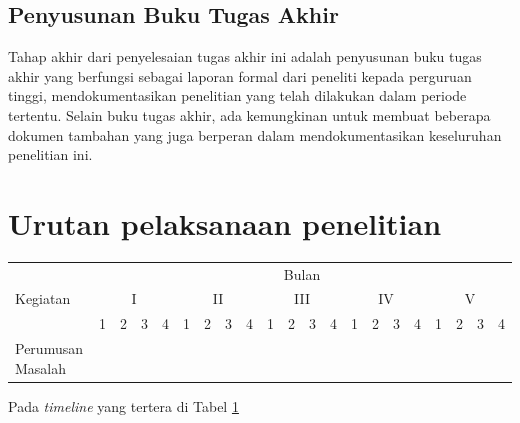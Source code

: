 \subsection{Penyusunan Buku Tugas Akhir}
Tahap akhir dari penyelesaian tugas akhir ini adalah penyusunan buku tugas akhir yang berfungsi sebagai laporan formal dari peneliti kepada perguruan tinggi, mendokumentasikan penelitian yang telah dilakukan dalam periode tertentu. Selain buku tugas akhir, ada kemungkinan untuk membuat beberapa dokumen tambahan yang juga berperan dalam mendokumentasikan keseluruhan penelitian ini.



\section{Urutan pelaksanaan penelitian}
\newcommand{\w}{}
\newcommand{\G}{\cellcolor{gray}}
\begin{table}[H]
  \label{tbl:timeline}
  \begin{tabular}{|p{2.5cm}|c|c|c|c|c|c|c|c|c|c|c|c|c|c|c|c|c|c|c|c|}

    \hline
    \multirow{3}{*}{Kegiatan} & \multicolumn{20}{|c|}{Bulan}                                                                 \\
    \cline{2-21}  & \multicolumn{4}{|c|}{I} & \multicolumn{4}{|c|}{II} & \multicolumn{4}{|c|}{III} & \multicolumn{4}{|c|}{IV} & \multicolumn{4}{|c|}{V} \\
    \cline{2-21}              &
    1                         & 2                             & 3  & 4  & 1  & 2  & 3  & 4  & 1  & 2 & 3 & 4 & 1  & 2 & 3 & 4 & 1  & 2 & 3 & 4 \\
    \hline

    Perumusan Masalah          &
    \G                        & \G                            & \G & \G & \w & \w & \w & \w & \w & \w & \w & \w & \w & \w & \w & \w & \w & \w & \w & \w \\
    \hline
  \end{tabular}
\end{table}

Pada \emph{timeline} yang tertera di Tabel \ref{tbl:timeline} \lipsum[10]
